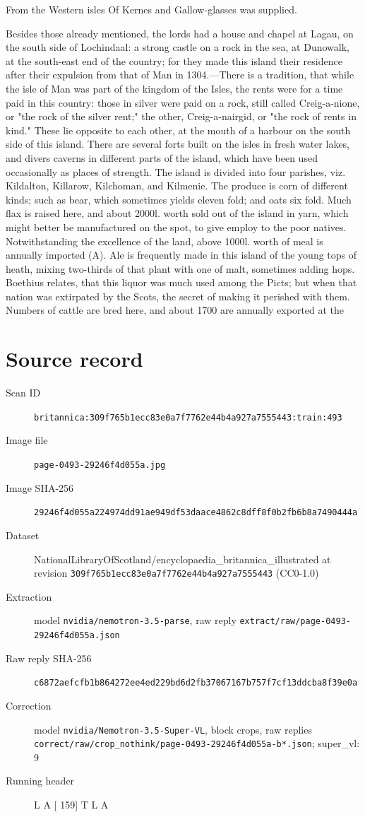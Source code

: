 \documentclass{article}
\begin{document}
From the Western isles
Of Kernes and Gallow-glasses was supplied.

Besides those already mentioned, the lords had a house and chapel at Lagau, on the south side of Lochindaal: a strong castle on a rock in the sea, at Dunowalk, at the south-east end of the country; for they made this island their residence after their expulsion from that of Man in 1304.—There is a tradition, that while the isle of Man was part of the kingdom of the Isles, the rents were for a time paid in this country: those in silver were paid on a rock, still called Creig-a-nione, or "the rock of the silver rent;" the other, Creig-a-nairgid, or "the rock of rents in kind." These lie opposite to each other, at the mouth of a harbour on the south side of this island. There are several forts built on the isles in fresh water lakes, and divers caverns in different parts of the island, which have been used occasionally as places of strength. The island is divided into four parishes, viz. Kildalton, Killarow, Kilchoman, and Kilmenie. The produce is corn of different kinds; such as bear, which sometimes yields eleven fold; and oats six fold. Much flax is raised here, and about 2000l. worth sold out of the island in yarn, which might better be manufactured on the spot, to give employ to the poor natives. Notwithstanding the excellence of the land, above 1000l. worth of meal is annually imported (A). Ale is frequently made in this island of the young tops of heath, mixing two-thirds of that plant with one of malt, sometimes adding hops. Boethius relates, that this liquor was much used among the Picts; but when that nation was extirpated by the Scots, the secret of making it perished with them. Numbers of cattle are bred here, and about 1700 are annually exported at the


\section*{Source record}
\begin{description}
\item[Scan ID] \texttt{britannica:309f765b1ecc83e0a7f7762e44b4a927a7555443:train:493}
\item[Image file] \texttt{page-0493-29246f4d055a.jpg}
\item[Image SHA-256] \texttt{29246f4d055a224974dd91ae949df53daace4862c8dff8f0b2fb6b8a7490444a}
\item[Dataset] NationalLibraryOfScotland/encyclopaedia\_britannica\_illustrated at revision \texttt{309f765b1ecc83e0a7f7762e44b4a927a7555443} (CC0-1.0)
\item[Extraction] model \texttt{nvidia/nemotron-3.5-parse}, raw reply \texttt{extract/raw/page-0493-29246f4d055a.json}
\item[Raw reply SHA-256] \texttt{c6872aefcfb1b864272ee4ed229bd6d2fb37067167b757f7cf13ddcba8f39e0a}
\item[Correction] model \texttt{nvidia/Nemotron-3.5-Super-VL}, block crops, raw replies \texttt{correct/raw/crop\_nothink/page-0493-29246f4d055a-b*.json}; super\_vl: 9
\item[Running header] L A [ 159] T L A
\end{description}
\end{document}
